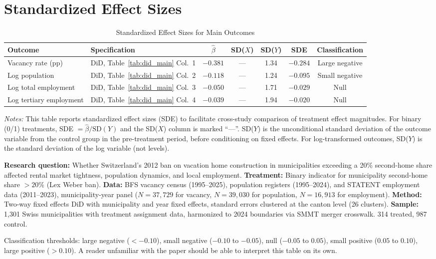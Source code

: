 \documentclass[12pt]{article}
\begin{document}
\section{Standardized Effect Sizes}
\label{sec:sde}

\begin{table}[H]
\centering
\caption{Standardized Effect Sizes for Main Outcomes}
\label{tab:sde_appendix}
\begin{adjustbox}{max width=\textwidth}
\begin{tabular}{llccccc}
\toprule
Outcome & Specification & $\hat{\beta}$ & SD($X$) & SD($Y$) & SDE & Classification \\
\midrule
Vacancy rate (pp) & DiD, Table~\ref{tab:did_main} Col.\ 1 & $-0.381$ & --- & 1.34 & $-0.284$ & Large negative \\
Log population & DiD, Table~\ref{tab:did_main} Col.\ 2 & $-0.118$ & --- & 1.24 & $-0.095$ & Small negative \\
Log total employment & DiD, Table~\ref{tab:did_main} Col.\ 3 & $-0.050$ & --- & 1.71 & $-0.029$ & Null \\
Log tertiary employment & DiD, Table~\ref{tab:did_main} Col.\ 4 & $-0.039$ & --- & 1.94 & $-0.020$ & Null \\
\bottomrule
\end{tabular}
\end{adjustbox}
\par\vspace{0.3em}
{\footnotesize \emph{Notes:} This table reports standardized effect sizes (SDE)
to facilitate cross-study comparison of treatment effect magnitudes.
For binary (0/1) treatments, SDE $= \hat{\beta} / \text{SD}(Y)$ and the SD($X$)
column is marked ``---''.
SD($Y$) is the unconditional standard deviation of the outcome variable
from the control group in the pre-treatment period, before conditioning
on fixed effects. For log-transformed outcomes, SD($Y$) is the standard
deviation of the log variable (not levels).

\textbf{Research question:} Whether Switzerland's 2012 ban on vacation home construction in municipalities exceeding a 20\% second-home share affected rental market tightness, population dynamics, and local employment.
\textbf{Treatment:} Binary indicator for municipality second-home share $>20\%$ (Lex Weber ban).
\textbf{Data:} BFS vacancy census (1995--2025), population registers (1995--2024), and STATENT employment data (2011--2023), municipality-year panel ($N = 37{,}729$ for vacancy, $N = 39{,}030$ for population, $N = 16{,}913$ for employment).
\textbf{Method:} Two-way fixed effects DiD with municipality and year fixed effects, standard errors clustered at the canton level (26 clusters).
\textbf{Sample:} 1{,}301 Swiss municipalities with treatment assignment data, harmonized to 2024 boundaries via SMMT merger crosswalk. 314 treated, 987 control.

Classification thresholds:
large negative ($< -0.10$), small negative ($-0.10$ to $-0.05$),
null ($-0.05$ to $0.05$), small positive ($0.05$ to $0.10$),
large positive ($> 0.10$).
A reader unfamiliar with the paper should be able to interpret this table
on its own.}
\end{table}
\end{document}
